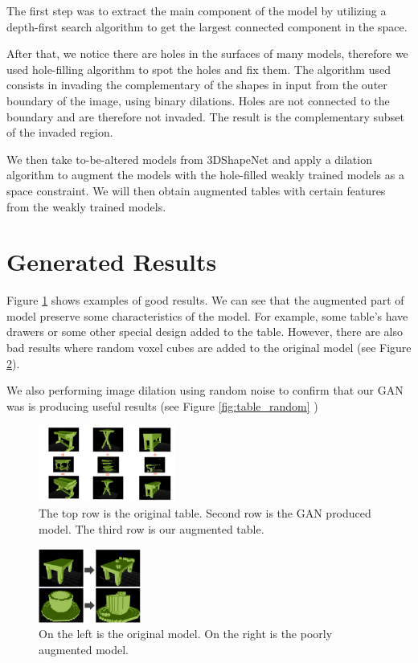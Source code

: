 \documentclass{sigchi}
\begin{document}
The first step was to extract the main component of the model by utilizing a depth-first search algorithm to get the largest connected component in the space.

After that, we notice there are holes in the surfaces of many models, therefore we used hole-filling algorithm to spot the holes and fix them. The algorithm used consists in invading the complementary of the shapes in input from the outer boundary of the image, using binary dilations. Holes are not connected to the boundary and are therefore not invaded. The result is the complementary subset of the invaded region.

We then take to-be-altered models from 3DShapeNet and apply a dilation algorithm to augment the models with the hole-filled weakly trained models as a space constraint. We will then obtain augmented tables with certain features from the weakly trained models.


\section{Generated Results}

Figure \ref{fig:table_results} shows examples of good results. We can see that the augmented part of model preserve some characteristics of the model. For example, some table’s have drawers or some other special design added to the table. However, there are also bad results where random voxel cubes are added to the original model (see Figure \ref{fig:bad_results}). 

We also performing image dilation using random noise to confirm that our GAN was is producing useful results (see Figure \ref{fig:table_random} )

\begin{figure}
\includegraphics[width=0.4\textwidth]{figs/table_results.png}
\centering
\caption{The top row is the original table. Second row is the GAN produced model. The third row is our augmented table.}
\label{fig:table_results}
\end{figure}

\begin{figure}
\includegraphics[width=0.3\textwidth]{figs/bad_results.png}
\centering
\caption{On the left is the original model. On the right is the poorly augmented model.}
\label{fig:bad_results}
\end{figure}
\end{document}
